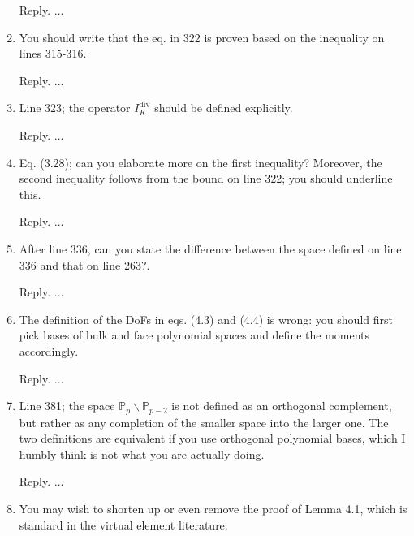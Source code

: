 \documentclass[10pt]{amsart}
\theoremstyle{definition}
\theoremstyle{remark}
\renewcommand{\div}{\operatorname{div}}
\begin{document}
\begin{enumerate}[1.]
\smallskip \noindent \textcolor[rgb]{1.00,0.00,0.00}{Reply.}
...

\medskip

\item \textsf{You should write that the eq. in 322 is proven based on the inequality on lines 315-316.}

\smallskip \noindent \textcolor[rgb]{1.00,0.00,0.00}{Reply.}
...

\medskip

\item \textsf{Line 323; the operator $I_K^{\div}$ should be defined explicitly.}

\smallskip \noindent \textcolor[rgb]{1.00,0.00,0.00}{Reply.}
...

\medskip

\item \textsf{Eq. (3.28); can you elaborate more on the first inequality? Moreover, the second inequality follows from the bound on line 322; you should underline this.}

\smallskip \noindent \textcolor[rgb]{1.00,0.00,0.00}{Reply.}
...

\medskip

\item \textsf{After line 336, can you state the difference between the space defined on line 336 and that on line 263?.}

\smallskip \noindent \textcolor[rgb]{1.00,0.00,0.00}{Reply.}
...

\medskip

\item \textsf{The definition of the DoFs in eqs. (4.3) and (4.4) is wrong: you should first pick bases of bulk and face polynomial spaces and define the moments accordingly.}

\smallskip \noindent \textcolor[rgb]{1.00,0.00,0.00}{Reply.}
...

\medskip

\item \textsf{Line 381; the space $\mathbb P_p\backslash\mathbb P_{p-2}$ is not defined as an orthogonal complement, but rather as any completion of the smaller space into the larger one. The two definitions are equivalent if you use orthogonal polynomial bases, which I humbly think is not what you are actually doing.}

\smallskip \noindent \textcolor[rgb]{1.00,0.00,0.00}{Reply.}
...

\medskip

\item \textsf{You may wish to shorten up or even remove the proof of Lemma 4.1, which is standard in the virtual element literature.}


\end{enumerate}
\end{document}
